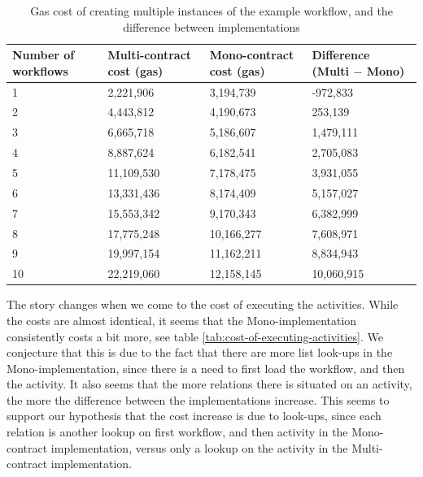 \documentclass{article}
\begin{document}
	\begin{table}[]
		\centering
		\label{tab:cost-of-creating-multiple-workflows}
		\begin{tabular}{|p{2.5cm}|p{2.5cm}|p{2.5cm}|p{2.5cm}|}
			\hline
			Number of workflows & Multi-contract cost (gas) & Mono-contract cost (gas) 	& Difference (Multi $-$ Mono)   \\\hline
			1                   & 2,221,906                 & 3,194,739                 & -972,833          			\\\hline
			2                   & 4,443,812                 & 4,190,673                 & 253,139          				\\\hline
			3                   & 6,665,718                 & 5,186,607                 & 1,479,111          			\\\hline
			4                   & 8,887,624                 & 6,182,541                 & 2,705,083          			\\\hline
			5                   & 11,109,530                & 7,178,475                 & 3,931,055          			\\\hline
			6                   & 13,331,436                & 8,174,409                 & 5,157,027          			\\\hline
			7                   & 15,553,342                & 9,170,343                 & 6,382,999          			\\\hline
			8                   & 17,775,248                & 10,166,277                & 7,608,971          			\\\hline
			9                   & 19,997,154                & 11,162,211                & 8,834,943          			\\\hline
			10                  & 22,219,060                & 12,158,145                & 10,060,915          			\\\hline
		\end{tabular}      
		\caption{Gas cost of creating multiple instances of the example workflow, and the difference between implementations}
	\end{table}

	The story changes when we come to the cost of executing the activities. 
	While the costs are almost identical, it seems that the Mono-implementation consistently costs a bit more, see table \ref{tab:cost-of-executing-activities}.
	We conjecture that this is due to the fact that there are more list look-ups in the Mono-implementation, since there is a need to first load the workflow, and then the activity.
	It also seems that the more relations there is situated on an activity, the more the difference between the implementations increase.
	This seems to support our hypothesis that the cost increase is due to look-ups, since each relation is another lookup on first workflow, and then activity in the Mono-contract implementation, versus only a lookup on the activity in the Multi-contract implementation. 
\end{document}
